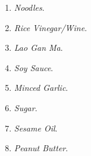 \documentclass{article}
\begin{document}
  \begin{definition}
    \begin{enumerate}
      \item \textit{Noodles}. 
      \item \textit{Rice Vinegar/Wine}. 
      \item \textit{Lao Gan Ma}. 
      \item \textit{Soy Sauce}. 
      \item \textit{Minced Garlic}. 
      \item \textit{Sugar}. 
      \item \textit{Sesame Oil}. 
      \item \textit{Peanut Butter}. 
    \end{enumerate}
  \end{definition}
\end{document}
